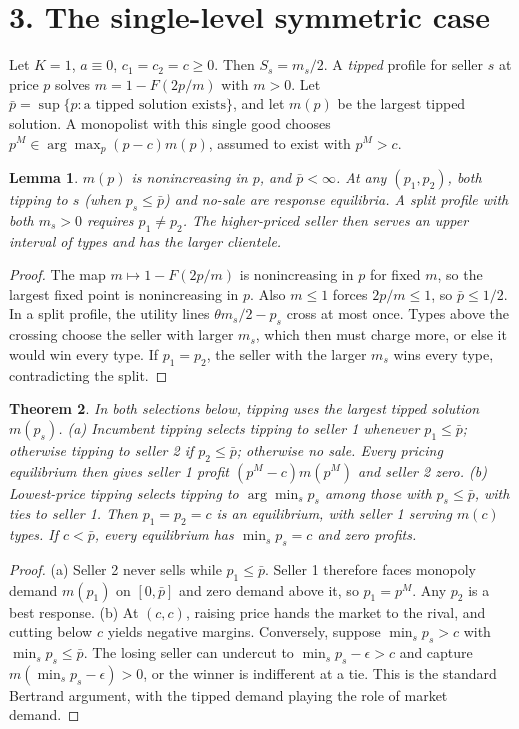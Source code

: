 \documentclass[11pt]{article}
\newtheorem{theorem}{Theorem}
\newtheorem{lemma}[theorem]{Lemma}
\theoremstyle{definition}
\begin{document}
\section*{3. The single-level symmetric case}
Let $K=1$, $a\equiv0$, $c_1=c_2=c\ge0$. Then $S_s=m_s/2$. A \emph{tipped} profile for seller $s$ at price $p$ solves
$m=1-F(2p/m)$ with $m>0$. Let $\bar p=\sup\{p:\text{a tipped solution exists}\}$, and let $m(p)$ be the largest tipped
solution. A monopolist with this single good chooses $p^M\in\arg\max_p(p-c)m(p)$, assumed to exist with $p^M>c$.
\begin{lemma}\label{lem:tip}
$m(p)$ is nonincreasing in $p$, and $\bar p<\infty$. At any $(p_1,p_2)$, both tipping to $s$ (when $p_s\le\bar p$) and no-sale
are response equilibria. A split profile with both $m_s>0$ requires $p_1\ne p_2$. The higher-priced seller then serves an upper
interval of types and has the larger clientele.
\end{lemma}
\begin{proof}
The map $m\mapsto1-F(2p/m)$ is nonincreasing in $p$ for fixed $m$, so the largest fixed point is nonincreasing in $p$. Also
$m\le1$ forces $2p/m\le1$, so $\bar p\le1/2$. In a split profile, the utility lines $\theta m_s/2-p_s$ cross at most once.
Types above the crossing choose the seller with larger $m_s$, which then must charge more, or else it would win every type.
If $p_1=p_2$, the seller with the larger $m_s$ wins every type, contradicting the split.
\end{proof}
\begin{theorem}\label{thm:sel}
In both selections below, tipping uses the largest tipped solution $m(p_s)$.
(a) \emph{Incumbent tipping} selects tipping to seller 1 whenever $p_1\le\bar p$; otherwise tipping to seller 2 if
$p_2\le\bar p$; otherwise no sale. Every pricing equilibrium then gives seller 1 profit $(p^M-c)m(p^M)$ and seller 2 zero.
(b) \emph{Lowest-price tipping} selects tipping to $\arg\min_sp_s$ among those with $p_s\le\bar p$, with ties to seller 1.
Then $p_1=p_2=c$ is an equilibrium, with seller 1 serving $m(c)$ types. If $c<\bar p$, every equilibrium has
$\min_sp_s=c$ and zero profits.
\end{theorem}
\begin{proof}
(a) Seller 2 never sells while $p_1\le\bar p$. Seller 1 therefore faces monopoly demand $m(p_1)$ on $[0,\bar p]$ and zero
demand above it, so $p_1=p^M$. Any $p_2$ is a best response.
(b) At $(c,c)$, raising price hands the market to the rival, and cutting below $c$ yields negative margins. Conversely,
suppose $\min_sp_s>c$ with $\min_sp_s\le\bar p$. The losing seller can undercut to $\min_sp_s-\epsilon>c$ and capture
$m(\min_sp_s-\epsilon)>0$, or the winner is indifferent at a tie. This is the standard Bertrand argument, with the
tipped demand playing the role of market demand.
\end{proof}
\end{document}
